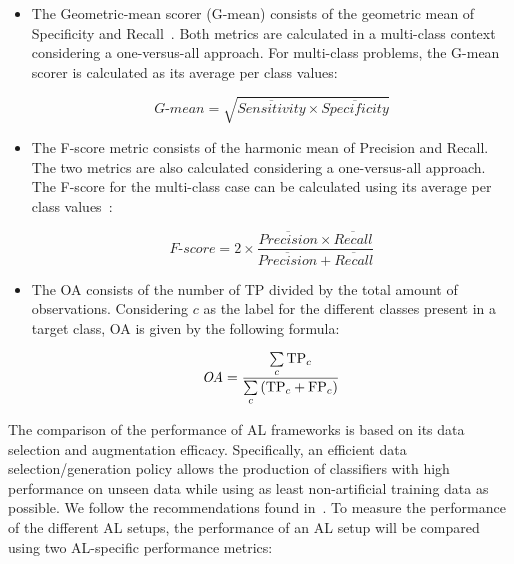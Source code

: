 \documentclass[10pt,journal,compsoc]{IEEEtran}
\begin{document}
\begin{itemize}
    \item The Geometric-mean scorer (G-mean) consists of the geometric mean of
        Specificity and Recall~\cite{Kubat1997}. Both metrics are calculated
        in a multi-class context considering a one-versus-all approach. For
        multi-class problems, the G-mean scorer is calculated as its average
        per class values: 
        
        \begin{equation*}
            \textit{G-mean} = \sqrt{\overline{Sensitivity} \times
            \overline{Specificity}}
        \end{equation*}

    \item The F-score metric consists of the harmonic mean of Precision and
        Recall. The two metrics are also calculated considering a
        one-versus-all approach. The F-score for the multi-class case can be
        calculated using its average per class values~\cite{Jeni2013}:

        \begin{equation*}
            \textit{F-score}=2\times\frac{\overline{Precision} \times
            \overline{Recall}}{\overline{Precision} + \overline{Recall}}
        \end{equation*}

    \item The OA consists of the number of TP divided by the total amount of
        observations. Considering $c$ as the label for the different classes
        present in a target class, OA is given by the following formula:

        \begin{equation*}
            \textit{OA} = \frac{\sum\limits_{c}{\text{TP}_{c}}}{%
		    	      \sum\limits_{c}{(\text{TP}_{c}+\text{FP}_{c})}}
        \end{equation*}
\end{itemize}

The comparison of the performance of AL frameworks is based on its data
selection and augmentation efficacy. Specifically, an efficient data
selection/generation policy allows the production of classifiers with high
performance on unseen data while using as least non-artificial training data
as possible. We follow the recommendations found in~\cite{Kottke2017}. To
measure the performance of the different AL setups, the performance of an AL
setup will be compared using two AL-specific performance metrics:
\end{document}
